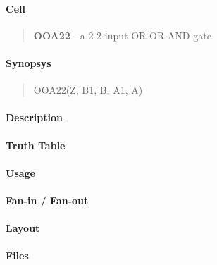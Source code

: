 \label{OOA22}
\paragraph{Cell}
\begin{quote}
    \textbf{OOA22} - a 2-2-input OR-OR-AND gate
\end{quote}

\paragraph{Synopsys}
\begin{quote}
    OOA22(Z, B1, B, A1, A)
\end{quote}

\paragraph{Description}

%

\paragraph{Truth Table}
%

\paragraph{Usage}

\paragraph{Fan-in / Fan-out}

\paragraph{Layout}

\paragraph{Files}

\clearpage
